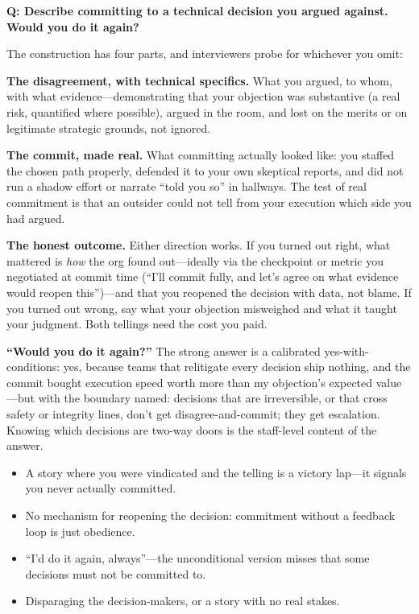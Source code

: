 \begin{interviewq}
\textbf{Q: Describe committing to a technical decision you argued against. Would you do it again?}

 \quad {} \quad \badgefreq{\freqhigh}

\stronganswer

The construction has four parts, and interviewers probe for whichever you omit:

\textbf{The disagreement, with technical specifics.} What you argued, to whom, with what evidence---demonstrating that your objection was substantive (a real risk, quantified where possible), argued in the room, and lost on the merits or on legitimate strategic grounds, not ignored.

\textbf{The commit, made real.} What committing actually looked like: you staffed the chosen path properly, defended it to your own skeptical reports, and did not run a shadow effort or narrate ``told you so'' in hallways. The test of real commitment is that an outsider could not tell from your execution which side you had argued.

\textbf{The honest outcome.} Either direction works. If you turned out right, what mattered is \textit{how} the org found out---ideally via the checkpoint or metric you negotiated at commit time (``I'll commit fully, and let's agree on what evidence would reopen this'')---and that you reopened the decision with data, not blame. If you turned out wrong, say what your objection misweighed and what it taught your judgment. Both tellings need the cost you paid.

\textbf{``Would you do it again?''} The strong answer is a calibrated yes-with-conditions: yes, because teams that relitigate every decision ship nothing, and the commit bought execution speed worth more than my objection's expected value---but with the boundary named: decisions that are irreversible, or that cross safety or integrity lines, don't get disagree-and-commit; they get escalation. Knowing which decisions are two-way doors is the staff-level content of the answer.

\redflags
\begin{itemize}
    \item A story where you were vindicated and the telling is a victory lap---it signals you never actually committed.
    \item No mechanism for reopening the decision: commitment without a feedback loop is just obedience.
    \item ``I'd do it again, always''---the unconditional version misses that some decisions must not be committed to.
    \item Disparaging the decision-makers, or a story with no real stakes.
\end{itemize}


\end{interviewq}
